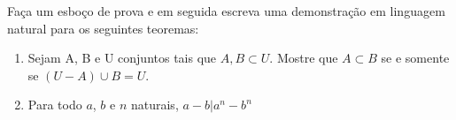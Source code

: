 \begin{exercise}
Faça um esboço de prova e em seguida escreva uma demonstração em linguagem natural para os seguintes teoremas:
\begin{enumerate}
	\item Sejam A, B e U conjuntos tais que $A, B \subset U$. Mostre que $A \subset B$ se e somente se $(U - A) \cup B = U$.
	\item Para todo $a$, $b$ e $n$ naturais, $ a - b \vert a^n - b^n $  
\end{enumerate}
\end{exercise}

